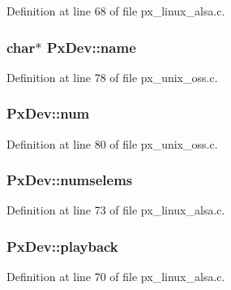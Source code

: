 Definition at line 68 of file px\+\_\+linux\+\_\+alsa.\+c.

\subsubsection[{\texorpdfstring{name}{name}}]{ char$\ast$ Px\+Dev\+::name}\hypertarget{struct_px_dev_a273a11f4c6f5391a10c2eff6065b3ad9}{}\label{struct_px_dev_a273a11f4c6f5391a10c2eff6065b3ad9}


Definition at line 78 of file px\+\_\+unix\+\_\+oss.\+c.

\subsubsection[{\texorpdfstring{num}{num}}]{ Px\+Dev\+::num}\hypertarget{struct_px_dev_a2de180f172743685d701800a359ec710}{}\label{struct_px_dev_a2de180f172743685d701800a359ec710}


Definition at line 80 of file px\+\_\+unix\+\_\+oss.\+c.

\subsubsection[{\texorpdfstring{numselems}{numselems}}]{ Px\+Dev\+::numselems}\hypertarget{struct_px_dev_a6ef87a02c48b56cb5d244d460d8efcb9}{}\label{struct_px_dev_a6ef87a02c48b56cb5d244d460d8efcb9}


Definition at line 73 of file px\+\_\+linux\+\_\+alsa.\+c.

\subsubsection[{\texorpdfstring{playback}{playback}}]{ Px\+Dev\+::playback}\hypertarget{struct_px_dev_af610bb780669676f95d76c4bc73eb931}{}\label{struct_px_dev_af610bb780669676f95d76c4bc73eb931}


Definition at line 70 of file px\+\_\+linux\+\_\+alsa.\+c.

